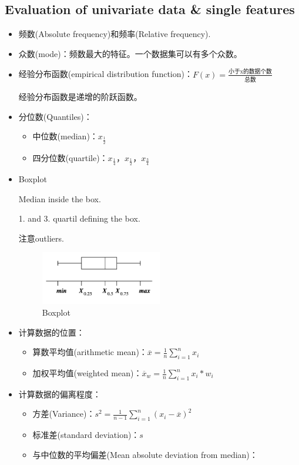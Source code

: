 \documentclass[12pt, a4paper, oneside]{ctexart}
\begin{document}
\subsection{Evaluation of univariate data \& single features}
\begin{itemize}
    \item 频数(Absolute frequency)和频率(Relative frequency).
    \item 众数(mode)：频数最大的特征。一个数据集可以有多个众数。
    \item 经验分布函数(empirical distribution function)：$F(x)=\frac{\mbox{小于x的数据个数}}{\mbox{总数}}$
    
    经验分布函数是递增的阶跃函数。
    \item 分位数(Quantiles)：
    \begin{itemize}
        \item 中位数(median)：$x_{\frac{1}{2}}$
        \item 四分位数(quartile)：$x_{\frac{1}{4}}$，$x_{\frac{1}{2}}$，$x_{\frac{3}{4}}$
    \end{itemize}
    \item Boxplot
    
    Median inside the box.

    1. and 3. quartil defining the box.

    注意outliers.
    \begin{figure}[htbp]
        \centering
        \includegraphics[width=0.5\textwidth]{boxplot.png}
        \caption{Boxplot}
    \end{figure}
    \item 计算数据的位置：
    \begin{itemize}
        \item 算数平均值(arithmetic mean)：$\overline{x}=\frac{1}{n}\sum_{i=1}^{n}x_i$ 
        \item 加权平均值(weighted mean)：$\overline{x}_w=\frac{1}{n}\sum_{i=1}^{n}x_i*w_i$ 
    \end{itemize}
    \item 计算数据的偏离程度：
    \begin{itemize}
        \item 方差(Variance)：$s^2=\frac{1}{n-1}\sum_{i=1}^{n}{(x_i-\overline{x})}^2$
        \item 标准差(standard deviation)：$s$
        \item 与中位数的平均偏差(Mean absolute deviation from median)：
        

\end{itemize}
\end{itemize}
\end{document}
